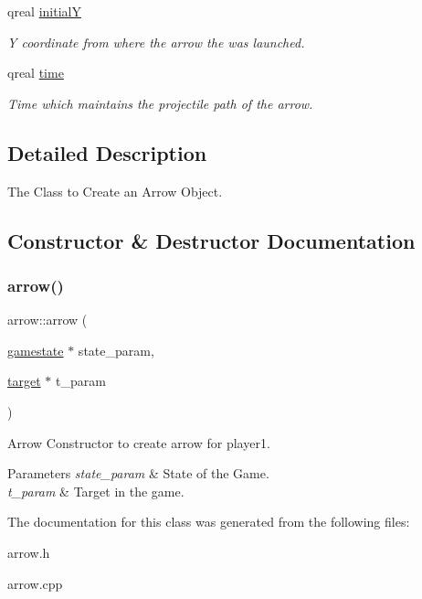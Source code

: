 \begin{DoxyCompactItemize}
\mbox{\label{classarrow_a6f052d5f3dfce79d72564bac1a760e88}} 
qreal \hyperlink{classarrow_a6f052d5f3dfce79d72564bac1a760e88}{initialY}
\begin{DoxyCompactList}\small\item\em Y coordinate from where the arrow the was launched. \end{DoxyCompactList}\item 
\mbox{\label{classarrow_aba775d30acf4655d9ffeabcf998b69f5}} 
qreal \hyperlink{classarrow_aba775d30acf4655d9ffeabcf998b69f5}{time}
\begin{DoxyCompactList}\small\item\em Time which maintains the projectile path of the arrow. \end{DoxyCompactList}\end{DoxyCompactItemize}


\subsection{Detailed Description}
The Class to Create an Arrow Object. 

\subsection{Constructor \& Destructor Documentation}
\mbox{\label{classarrow_aad351384362146630ada6411bde30640}} 
\subsubsection{\texorpdfstring{arrow()}{arrow()}}
{\footnotesize\ttfamily arrow\+::arrow (\begin{DoxyParamCaption}\item[{\hyperlink{classgamestate}{gamestate} $\ast$}]{state\+\_\+param,  }\item[{\hyperlink{classtarget}{target} $\ast$}]{t\+\_\+param }\end{DoxyParamCaption})}



Arrow Constructor to create arrow for player1. 


\begin{DoxyParams}{Parameters}
{\em state\+\_\+param} & State of the Game. \\
\hline
{\em t\+\_\+param} & Target in the game. \\
\hline
\end{DoxyParams}


The documentation for this class was generated from the following files\+:\begin{DoxyCompactItemize}
\item 
arrow.\+h\item 
arrow.\+cpp\end{DoxyCompactItemize}
